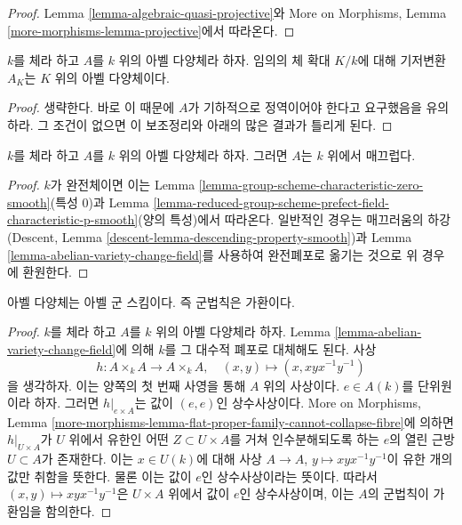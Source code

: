 \begin{proof}
Lemma \ref{lemma-algebraic-quasi-projective}와 More on Morphisms, Lemma
\ref{more-morphisms-lemma-projective}에서 따라온다.
\end{proof}

\begin{lemma}
\label{lemma-abelian-variety-change-field}
$k$를 체라 하고 $A$를 $k$ 위의 아벨 다양체라 하자. 임의의 체 확대 $K/k$에 대해 기저변환
$A_K$는 $K$ 위의 아벨 다양체이다.
\end{lemma}

\begin{proof}
생략한다. 바로 이 때문에 $A$가 기하적으로 정역이어야 한다고 요구했음을 유의하라.
그 조건이 없으면 이 보조정리와 아래의 많은 결과가 틀리게 된다.
\end{proof}

\begin{lemma}
\label{lemma-abelian-variety-smooth}
$k$를 체라 하고 $A$를 $k$ 위의 아벨 다양체라 하자. 그러면 $A$는 $k$ 위에서 매끄럽다.
\end{lemma}

\begin{proof}
$k$가 완전체이면 이는 Lemma \ref{lemma-group-scheme-characteristic-zero-smooth}(특성 0)과
Lemma \ref{lemma-reduced-group-scheme-prefect-field-characteristic-p-smooth}(양의 특성)에서 따라온다.
일반적인 경우는 매끄러움의 하강(Descent, Lemma \ref{descent-lemma-descending-property-smooth})과
Lemma \ref{lemma-abelian-variety-change-field}를 사용하여 완전폐포로 옮기는 것으로 위 경우에 환원한다.
\end{proof}

\begin{lemma}
\label{lemma-abelian-variety-abelian}
아벨 다양체는 아벨 군 스킴이다. 즉 군법칙은 가환이다.
\end{lemma}

\begin{proof}
$k$를 체라 하고 $A$를 $k$ 위의 아벨 다양체라 하자. Lemma \ref{lemma-abelian-variety-change-field}에 의해
$k$를 그 대수적 폐포로 대체해도 된다. 사상
$$
h : A \times_k A \longrightarrow A \times_k A,\quad
(x, y) \longmapsto (x, xyx^{-1}y^{-1})
$$
을 생각하자. 이는 양쪽의 첫 번째 사영을 통해 $A$ 위의 사상이다. $e \in A(k)$를 단위원이라 하자.
그러면 $h|_{e \times A}$는 값이 $(e, e)$인 상수사상이다. More on Morphisms, Lemma
\ref{more-morphisms-lemma-flat-proper-family-cannot-collapse-fibre}에 의하면 $h|_{U \times A}$가 $U$ 위에서 유한인
어떤 $Z \subset U \times A$를 거쳐 인수분해되도록 하는 $e$의 열린 근방 $U \subset A$가 존재한다.
이는 $x \in U(k)$에 대해 사상 $A \to A$, $y \mapsto xyx^{-1}y^{-1}$이 유한 개의 값만 취함을 뜻한다.
물론 이는 값이 $e$인 상수사상이라는 뜻이다. 따라서 $(x, y) \mapsto xyx^{-1}y^{-1}$은
$U \times A$ 위에서 값이 $e$인 상수사상이며, 이는 $A$의 군법칙이 가환임을 함의한다.
\end{proof}

